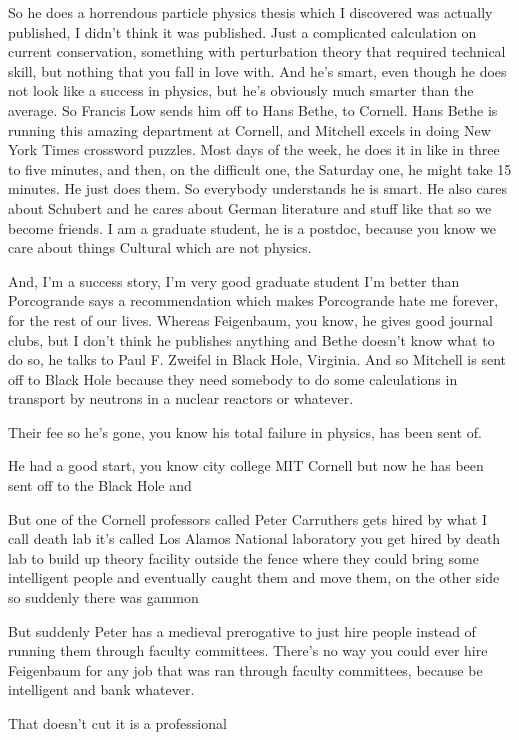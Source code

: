 \begin{description}
So he does a horrendous particle physics thesis which I discovered was
actually published, I didn't think it was published. Just a
complicated calculation on current conservation, something
with perturbation theory that required technical skill, but nothing
that you fall in love with. And he's smart, even though he does not
look like a success in physics, but he's obviously much smarter
than the average. So Francis Low sends him off to Hans Bethe, to
Cornell. Hans Bethe is running this amazing department at Cornell,
and Mitchell excels in doing New York Times crossword puzzles. Most
days of the week, he does it in like in three to five minutes, and
then, on the difficult one, the Saturday one, he might take 15
minutes. He just does them. So everybody understands he is smart.
He also cares about Schubert and he cares about German literature
and stuff like that so we become friends. I am a graduate student,
he is a postdoc, because you know we care about things Cultural
which are not physics.

And, I'm a success story,  I'm very good graduate student I'm
better than Porcogrande says a recommendation which makes
Porcogrande hate me forever, for the rest of our lives.
Whereas Feigenbaum, you know, he gives good journal clubs,
but I don't think he publishes anything and Bethe doesn't know what
to do so, he talks to Paul F. Zweifel in Black Hole, Virginia.
And so Mitchell is sent off to Black Hole because they need somebody to do
some calculations in transport by neutrons in a nuclear reactors
or whatever.

Their fee so he's gone, you know his total failure in physics, has
been sent of.

He had a good start, you know city college MIT
Cornell but now he has been sent off to the Black Hole and

But one of the Cornell professors called Peter Carruthers gets
hired by what I call death lab it's called Los Alamos National
laboratory you get hired by death lab to build up theory facility
outside the fence where they could bring some intelligent people
and eventually caught them and move them, on the other side so
suddenly there was gammon

But suddenly Peter has a medieval prerogative to just hire people
instead of running them through faculty committees. There's no
way you could ever hire Feigenbaum for any job that was ran through
faculty committees, because be intelligent and bank whatever.

That doesn't cut it is a professional


\end{description}
